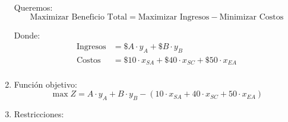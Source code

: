 \documentclass[../main.tex]{subfiles}
\begin{document}
\begin{exercise}
\begin{enumerate}
                    Queremos:
                    \begin{equation*}
                        \text{Maximizar Beneficio Total} = \text{Maximizar Ingresos} - \text{Minimizar Costos}
                    \end{equation*}

                    Donde:
                    \begin{equation*}
                        \begin{split}
                            \text{Ingresos} &= \$A \cdot y_A + \$B \cdot y_B \\
                            \text{Costos} &= \$10 \cdot x_{SA} + \$40 \cdot x_{SC} + \$50 \cdot x_{EA} \\
                        \end{split}
                    \end{equation*}
                \item Función objetivo:
                    \begin{equation}
                        \max Z =  A \cdot y_A + B \cdot y_B - (10 \cdot x_{SA} + 40 \cdot x_{SC} + 50 \cdot x_{EA})
                    \end{equation}

                \item Restricciones:
                

\end{enumerate}
\end{exercise}
\end{document}
